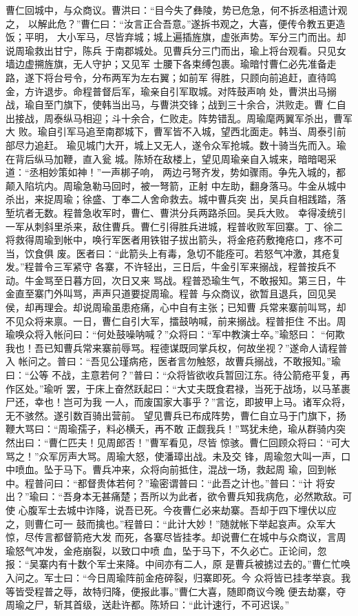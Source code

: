 曹仁回城中，与众商议。曹洪曰：“目今失了彝陵，势已危急，何不拆丞相遗计观之，
以解此危？”曹仁曰：“汝言正合吾意。”遂拆书观之，大喜，便传令教五更造饭；平明，
大小军马，尽皆弃城；城上遍插旌旗，虚张声势。军分三门而出。却说周瑜救出甘宁，陈兵
于南郡城处。见曹兵分三门而出，瑜上将台观看。只见女墙边虚搠旌旗，无人守护；又见军
士腰下各束缚包裹。瑜暗忖曹仁必先准备走路，遂下将台号令，分布两军为左右翼；如前军
得胜，只顾向前追赶，直待鸣金，方许退步。命程普督后军，瑜亲自引军取城。对阵鼓声响
处，曹洪出马搦战，瑜自至门旗下，使韩当出马，与曹洪交锋；战到三十余合，洪败走。曹
仁自出接战，周泰纵马相迎；斗十余合，仁败走。阵势错乱。周瑜麾两翼军杀出，曹军大
败。瑜自引军马追至南郡城下，曹军皆不入城，望西北面走。韩当、周泰引前部尽力追赶。
瑜见城门大开，城上又无人，遂令众军抢城。数十骑当先而入。瑜在背后纵马加鞭，直入瓮
城。陈矫在敌楼上，望见周瑜亲自入城来，暗暗喝采道：“丞相妙策如神！”一声梆子响，
两边弓弩齐发，势如骤雨。争先入城的，都颠入陷坑内。周瑜急勒马回时，被一弩箭，正射
中左助，翻身落马。牛金从城中杀出，来捉周瑜；徐盛、丁奉二人舍命救去。城中曹兵突
出，吴兵自相践踏，落堑坑者无数。程普急收军时，曹仁、曹洪分兵两路杀回。吴兵大败。
幸得凌统引一军从刺斜里杀来，敌住曹兵。曹仁引得胜兵进城，程普收败军回寨。丁、徐二
将救得周瑜到帐中，唤行军医者用铁钳子拔出箭头，将金疮药敷掩疮口，疼不可当，饮食俱
废。医者曰：“此箭头上有毒，急切不能痊可。若怒气冲激，其疮复发。”程普令三军紧守
各寨，不许轻出，三日后，牛金引军来搦战，程普按兵不动。牛金骂至日暮方回，次日又来
骂战。程普恐瑜生气，不敢报知。第三日，牛金直至寨门外叫骂，声声只道要捉周瑜。程普
与众商议，欲暂且退兵，回见吴侯，却再理会。却说周瑜虽患疮痛，心中自有主张；已知曹
兵常来寨前叫骂，却不见众将来禀。一日，曹仁自引大军，擂鼓呐喊，前来搦战。程普拒住
不出。周瑜唤众将入帐问曰：“何处鼓噪呐喊？”众将曰：“军中教演士卒。”瑜怒曰：
“何欺我也！吾已知曹兵常来寨前辱骂。程德谋既同掌兵权，何故坐视？”遂命人请程普入
帐问之。普曰：“吾见公瑾病疮，医者言勿触怒，故曹兵搦战，不敢报知。”瑜曰：“公等
不战，主意若何？”普曰：“众将皆欲收兵暂回江东。待公箭疮平复，再作区处。”瑜听
罢，于床上奋然跃起曰：“大丈夫既食君禄，当死于战场，以马革裹尸还，幸也！岂可为我
一人，而废国家大事乎？”言讫，即披甲上马。诸军众将，无不骇然。遂引数百骑出营前。
望见曹兵已布成阵势，曹仁自立马于门旗下，扬鞭大骂曰：“周瑜孺子，料必横夭，再不敢
正觑我兵！”骂犹未绝，瑜从群骑内突然出曰：“曹仁匹夫！见周郎否！”曹军看见，尽皆
惊骇。曹仁回顾众将曰：“可大骂之！”众军厉声大骂。周瑜大怒，使潘璋出战。未及交
锋，周瑜忽大叫一声，口中喷血。坠于马下。曹兵冲来，众将向前抵住，混战一场，救起周
瑜，回到帐中。程普问曰：“都督贵体若何？”瑜密谓普曰：“此吾之计也。”普曰：“计
将安出？”瑜曰：“吾身本无甚痛楚；吾所以为此者，欲令曹兵知我病危，必然欺敌。可使
心腹军士去城中诈降，说吾已死。今夜曹仁必来劫寨。吾却于四下埋伏以应之，则曹仁可一
鼓而擒也。”程普曰：“此计大妙！”随就帐下举起哀声。众军大惊，尽传言都督箭疮大发
而死，各寨尽皆挂孝。却说曹仁在城中与众商议，言周瑜怒气冲发，金疮崩裂，以致口中喷
血，坠于马下，不久必亡。正论间，忽报：“吴寨内有十数个军士来降。中间亦有二人，原
是曹兵被掳过去的。”曹仁忙唤入问之。军士曰：“今日周瑜阵前金疮碎裂，归寨即死。今
众将皆已挂孝举哀。我等皆受程普之辱，故特归降，便报此事。”曹仁大喜，随即商议今晚
便去劫寨，夺周瑜之尸，斩其首级，送赴许都。陈矫曰：“此计速行，不可迟误。”

